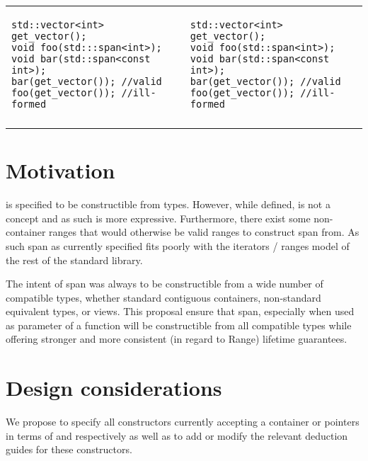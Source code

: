 \documentclass{wg21}
\begin{document}
\begin{center}
\begin{tabular}{l|l}
\begin{minipage}[t]{0.5\textwidth}
\begin{verbatim}
std::vector<int> get_vector();
void foo(std:::span<int>);
void bar(std::span<const int>);
bar(get_vector()); //valid
foo(get_vector()); //ill-formed
\end{verbatim}
\end{minipage}
&
\begin{minipage}[t]{0.5\textwidth}
\begin{verbatim}
std::vector<int> get_vector();
void foo(std::span<int>);
void bar(std::span<const int>);
bar(get_vector()); //valid
foo(get_vector()); //ill-formed
\end{verbatim}
\end{minipage}
\\\\ \hline
\end{tabular}
\end{center}


\section{Motivation}

 is specified to be constructible from  types.
However, while defined,  is not a concept and as such  is more expressive.
Furthermore, there exist some non-container ranges that would otherwise be valid ranges to construct span from.
As such span as currently specified fits poorly with the iterators / ranges model of the rest of the standard library.

The intent of span was always to be constructible from a wide number of compatible types,
whether standard contiguous containers, non-standard equivalent types, or views.
This proposal ensure that span, especially when used as parameter of a function will be constructible
from all compatible types while offering stronger and more consistent (in regard to Range) lifetime guarantees.


\section{Design considerations}

We propose to specify all constructors currently accepting a container or pointers in terms of  and 
respectively as well as to add or modify the relevant deduction guides for these constructors.
\end{document}
